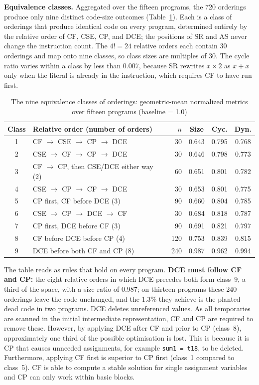 \documentclass[conference,a4paper]{IEEEtran}
\begin{document}
\textbf{Equivalence classes.} Aggregated over the fifteen programs, the 720 orderings produce only nine distinct code-size outcomes (Table~\ref{tab:classes}). Each is a class of orderings that produce identical code on every program, determined entirely by the relative order of CF, CSE, CP, and DCE; the positions of SR and AS never change the instruction count. The $4! = 24$ relative orders each contain 30 orderings and map onto nine classes, so class sizes are multiples of 30. The cycle ratio varies within a class by less than 0.007, because SR rewrites $x \times 2$ as $x + x$ only when the literal is already in the instruction, which requires CF to have run first.

\begin{table}[!htbp]
\centering
\caption{The nine equivalence classes of orderings: geometric-mean normalized metrics over fifteen programs (baseline = 1.0)}
\label{tab:classes}
\renewcommand{\arraystretch}{1.05}
{\footnotesize
\setlength{\tabcolsep}{2.5pt}
\begin{tabular}{@{}clrccc@{}}
\toprule
\textbf{Class} & \textbf{Relative order (number of orders)} & \textbf{$n$} & \textbf{Size} & \textbf{Cyc.} & \textbf{Dyn.} \\
\midrule
1 & CF $\to$ CSE $\to$ CP $\to$ DCE & 30 & 0.643 & 0.795 & 0.768 \\
2 & CSE $\to$ CF $\to$ CP $\to$ DCE & 30 & 0.646 & 0.798 & 0.773 \\
3 & CF $\to$ CP, then CSE/DCE either way (2) & 60 & 0.651 & 0.801 & 0.782 \\
4 & CSE $\to$ CP $\to$ CF $\to$ DCE & 30 & 0.653 & 0.801 & 0.775 \\
5 & CP first, CF before DCE (3) & 90 & 0.660 & 0.804 & 0.785 \\
6 & CSE $\to$ CP $\to$ DCE $\to$ CF & 30 & 0.684 & 0.818 & 0.787 \\
7 & CP first, DCE before CF (3) & 90 & 0.691 & 0.821 & 0.797 \\
8 & CF before DCE before CP (4) & 120 & 0.753 & 0.839 & 0.815 \\
9 & DCE before both CF and CP (8) & 240 & 0.987 & 0.962 & 0.994 \\
\bottomrule
\end{tabular}
}
\end{table}

The table reads as rules that hold on every program. \textbf{DCE must follow CF and CP:} the eight relative orders in which DCE precedes both form class~9, a third of the space, with a size ratio of 0.987; on thirteen programs these 240 orderings leave the code unchanged, and the 1.3\% they achieve is the planted dead code in two programs. DCE deletes unreferenced values. As all temporaries are scanned in the initial intermediate representation, CF and CP are required to remove these. However, by applying DCE after CF and prior to CP (class~8), approximately one third of the possible optimisation is lost. This is because it is CP that causes unneeded assignments, for example \texttt{sum1 = t18}, to be deleted. Furthermore, applying CF first is superior to CP first (class~1 compared to class~5). CF is able to compute a stable solution for single assignment variables and CP can only work within basic blocks.
\end{document}
